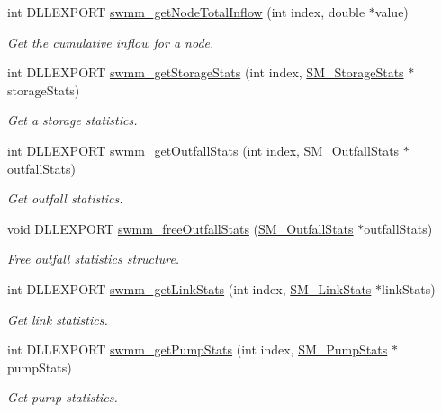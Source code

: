 \begin{DoxyCompactItemize}
int D\+L\+L\+E\+X\+P\+O\+RT \hyperlink{group__tkfuncs_gab5d65643b9dddba000e2ae1f62ec3c59}{swmm\+\_\+get\+Node\+Total\+Inflow} (int index, double $\ast$value)
\begin{DoxyCompactList}\small\item\em Get the cumulative inflow for a node. \end{DoxyCompactList}\item 
int D\+L\+L\+E\+X\+P\+O\+RT \hyperlink{group__tkfuncs_gaec84d7c193dff925aa02505b0977868d}{swmm\+\_\+get\+Storage\+Stats} (int index, \hyperlink{struct_s_m___storage_stats}{S\+M\+\_\+\+Storage\+Stats} $\ast$storage\+Stats)
\begin{DoxyCompactList}\small\item\em Get a storage statistics. \end{DoxyCompactList}\item 
int D\+L\+L\+E\+X\+P\+O\+RT \hyperlink{group__tkfuncs_ga290977608917eaf93fa259aeb080880a}{swmm\+\_\+get\+Outfall\+Stats} (int index, \hyperlink{struct_s_m___outfall_stats}{S\+M\+\_\+\+Outfall\+Stats} $\ast$outfall\+Stats)
\begin{DoxyCompactList}\small\item\em Get outfall statistics. \end{DoxyCompactList}\item 
void D\+L\+L\+E\+X\+P\+O\+RT \hyperlink{group__tkfuncs_ga24874b7dc37c161521f0c14899c2157d}{swmm\+\_\+free\+Outfall\+Stats} (\hyperlink{struct_s_m___outfall_stats}{S\+M\+\_\+\+Outfall\+Stats} $\ast$outfall\+Stats)
\begin{DoxyCompactList}\small\item\em Free outfall statistics structure. \end{DoxyCompactList}\item 
int D\+L\+L\+E\+X\+P\+O\+RT \hyperlink{group__tkfuncs_ga4895dbf445e9abd6d7e9eb72515c49e0}{swmm\+\_\+get\+Link\+Stats} (int index, \hyperlink{struct_s_m___link_stats}{S\+M\+\_\+\+Link\+Stats} $\ast$link\+Stats)
\begin{DoxyCompactList}\small\item\em Get link statistics. \end{DoxyCompactList}\item 
int D\+L\+L\+E\+X\+P\+O\+RT \hyperlink{group__tkfuncs_gafb2a5a295fb4a038edb2a36eab8c576d}{swmm\+\_\+get\+Pump\+Stats} (int index, \hyperlink{struct_s_m___pump_stats}{S\+M\+\_\+\+Pump\+Stats} $\ast$pump\+Stats)
\begin{DoxyCompactList}\small\item\em Get pump statistics. \end{DoxyCompactList}\item 

\end{DoxyCompactItemize}
